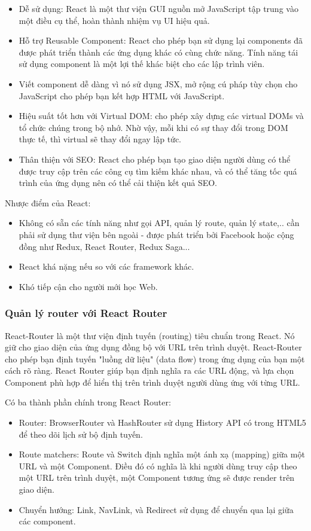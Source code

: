 \begin{itemize}
    \item Dễ sử dụng: React là một thư viện GUI nguồn mở JavaScript tập trung vào một điều cụ thể, hoàn thành nhiệm vụ UI hiệu quả.
    \item Hỗ trợ Reusable Component: React cho phép bạn sử dụng lại components đã được phát triển thành các ứng dụng khác có cùng chức năng. Tính năng tái sử dụng component là một lợi thế khác biệt cho các lập trình viên.
    \item Viết component dễ dàng vì nó sử dụng JSX, mở rộng cú pháp tùy chọn cho JavaScript cho phép bạn kết hợp HTML với JavaScript.
    \item Hiệu suất tốt hơn với Virtual DOM: cho phép xây dựng các virtual DOMs và tổ chức chúng trong bộ nhớ. Nhờ vậy, mỗi khi có sự thay đổi trong DOM thực tế, thì virtual sẽ thay đổi ngay lập tức.
    \item Thân thiện với SEO: React cho phép bạn tạo giao diện người dùng có thể được truy cập trên các công cụ tìm kiếm khác nhau, và có thể tăng tốc quá trình của ứng dụng nên có thể cải thiện kết quả SEO.
\end{itemize}
Nhược điểm của React:
\begin{itemize}
    \item Không có sẵn các tính năng như gọi API, quản lý route, quản lý state,.. cần phải sử dụng thư viện bên ngoài - được phát triển bởi Facebook hoặc
cộng đồng như Redux, React Router, Redux Saga...
    \item React khá nặng nếu so với các framework khác.
    \item Khó tiếp cận cho người mới học Web.
\end{itemize}

\subsubsection{Quản lý router với React Router}
React-Router \cite{router_react, react_router} là một thư viện định tuyến (routing) tiêu chuẩn trong React. Nó giữ cho giao diện của ứng dụng đồng bộ với URL trên trình duyệt. React-Router cho phép bạn định tuyến "luồng dữ liệu" (data flow) trong ứng dụng của bạn một cách rõ ràng. React Router giúp bạn định nghĩa ra các URL động, và lựa chọn Component phù hợp để hiển thị trên trình duyệt người dùng ứng với từng URL.\par
Có ba thành phần chính trong React Router:
\begin{itemize}
    \item Router: BrowserRouter và HashRouter sử dụng History API có trong HTML5 để theo dõi lịch sử bộ định tuyến.
    \item Route matchers: Route và Switch định nghĩa một ánh xạ (mapping) giữa một URL và một Component. Điều đó có nghĩa là khi người dùng truy cập theo một URL trên trình duyệt, một Component tương ứng sẽ được render trên giao diện.
    \item Chuyển hướng: Link, NavLink, và Redirect sử dụng để chuyển qua lại giữa các component.
\end{itemize}

